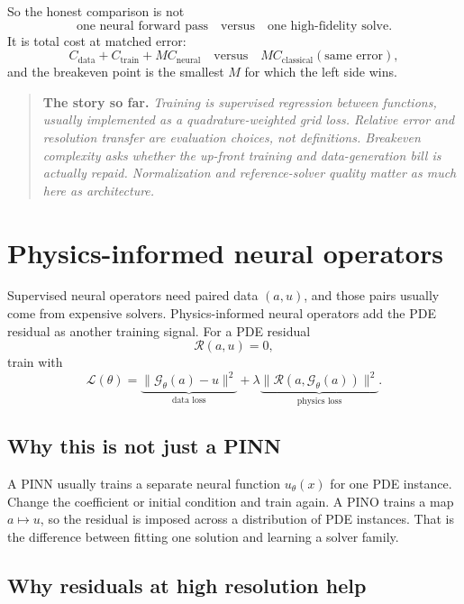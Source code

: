 \documentclass[10pt,a4paper]{article}
\newenvironment{recap}
{\par\medskip\noindent\begin{quote}\small\textbf{The story so far.}\itshape\;}
{\end{quote}\medskip}
\newcommand{\G}{\mathcal{G}}
\begin{document}
So the honest comparison is not
\[
  \text{one neural forward pass} \quad \text{versus} \quad
  \text{one high-fidelity solve}.
\]
It is total cost at matched error:
\[
  C_{\mathrm{data}} + C_{\mathrm{train}} + M C_{\mathrm{neural}}
  \quad \text{versus} \quad
  M C_{\mathrm{classical}}(\text{same error}),
\]
and the breakeven point is the smallest $M$ for which the left side wins.

\begin{recap}
Training is supervised regression between functions, usually implemented as a
quadrature-weighted grid loss. Relative error and resolution transfer are
evaluation choices, not definitions. Breakeven complexity asks whether the
up-front training and data-generation bill is actually repaid. Normalization
and reference-solver quality matter as much here as architecture.
\end{recap}

\section{Physics-informed neural operators}
\label{sec:pino}

Supervised neural operators need paired data $(a,u)$, and those pairs usually
come from expensive solvers. Physics-informed neural operators add the PDE
residual as another training signal. For a PDE residual
\[
  \mathcal{R}(a,u) = 0,
\]
train with
\begin{equation}
  \mathcal{L}(\theta)
  =
  \underbrace{\|\G_\theta(a)-u\|^2}_{\text{data loss}}
  +
  \lambda
  \underbrace{\|\mathcal{R}(a,\G_\theta(a))\|^2}_{\text{physics loss}}.
\label{eq:pino-loss}
\end{equation}

\subsection{Why this is not just a PINN}

A PINN usually trains a separate neural function $u_\theta(x)$ for one PDE
instance. Change the coefficient or initial condition and train again. A PINO
trains a map $a \mapsto u$, so the residual is imposed across a distribution
of PDE instances. That is the difference between fitting one solution and
learning a solver family.

\subsection{Why residuals at high resolution help}
\end{document}
